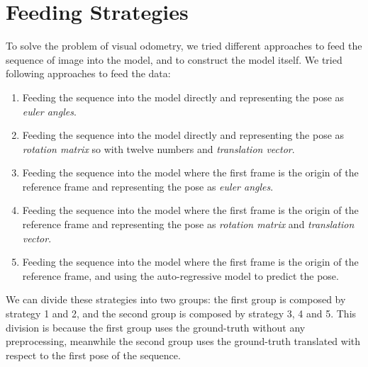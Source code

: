 \section{Feeding Strategies}\label{sec:prediction-strategies}
To solve the problem of visual odometry, we tried different approaches to feed the sequence of image into the model, and to construct the model itself.
We tried following approaches to feed the data:
\begin{enumerate}
    \item Feeding the sequence into the model directly and representing the pose as \emph{euler angles}.
    \item Feeding the sequence into the model directly and representing the pose as \emph{rotation matrix} so with twelve numbers and \emph{translation vector}.
    \item Feeding the sequence into the model where the first frame is the origin of the reference frame and representing the pose as \emph{euler angles}.
    \item Feeding the sequence into the model where the first frame is the origin of the reference frame and representing the pose as \emph{rotation matrix} and \emph{translation vector}.
    \item Feeding the sequence into the model where the first frame is the origin of the reference frame, and using the auto-regressive model to predict the pose.
\end{enumerate}
We can divide these strategies into two groups: the first group is composed by strategy 1 and 2, and the second group is composed by strategy 3, 4 and 5.
This division is because the first group uses the ground-truth without any preprocessing, meanwhile the second group uses the ground-truth translated with respect to the first pose of the sequence.

